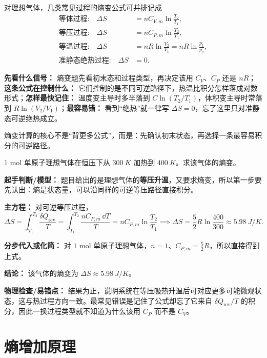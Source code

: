 \documentclass[lang=cn,11pt]{elegantbook}
\newcommand{\bridge}[1]{\begin{note}#1\end{note}}
\begin{document}
对理想气体，几类常见过程的熵变公式可并排记成
\begin{align*}
\text{等体过程:}\quad \Delta S&=nC_{V,m}\ln\frac{T_2}{T_1},\\
\text{等压过程:}\quad \Delta S&=nC_{P,m}\ln\frac{T_2}{T_1},\\
\text{等温过程:}\quad \Delta S&=nR\ln\frac{V_2}{V_1}=nR\ln\frac{p_1}{p_2},\\
\text{准静态绝热过程:}\quad \Delta S&=0.
\end{align*}

\begin{note}
\textbf{先看什么信号：} 熵变题先看初末态和过程类型，再决定该用 \(C_V\)、\(C_P\) 还是 \(nR\)；\textbf{这条公式在控制什么：} 它们控制的是不同可逆路径下，热温比积分怎样落成对数形式；\textbf{怎样最快记住：} 温度变主导时多半落到 \(C\ln(T_2/T_1)\)，体积变主导时常落到 \(R\ln(V_2/V_1)\)；\textbf{最容易错：} 看到“绝热”就一律写 \(\Delta S=0\)，忘了这里只对准静态可逆绝热成立。
\end{note}

\bridge{熵变计算的核心不是“背更多公式”，而是：先确认初末状态，再选择一条最容易积分的可逆路径。}

\begin{example}[等压升温的熵变]
1 mol 单原子理想气体在恒压下从 \(\SI{300}{K}\) 加热到 \(\SI{400}{K}\)。求该气体的熵变。
\end{example}

\begin{solution}
\textbf{起手判断/模型：} 题目给出的是理想气体的\textbf{等压升温}，又要求熵变，所以第一步要先认出：熵是状态量，可以沿同样的可逆等压路径直接积分。

\textbf{主方程：} 对可逆等压过程，
\[
\Delta S=\int_{T_1}^{T_2}\frac{\delta Q_{\mathrm{rev}}}{T}
=\int_{T_1}^{T_2}\frac{nC_{P,m}\,\dd T}{T}
=nC_{P,m}\ln\frac{T_2}{T_1}
\implies
\Delta S=\frac{5}{2}R\ln\frac{400}{300}\approx \SI{5.98}{J/K}.
\]

\textbf{分步代入或化简：} 对 \(1\) mol 单原子理想气体，\(n=1\)、\(C_{P,m}=\frac{5}{2}R\)，所以直接得到上式。

\textbf{结论：} 该气体的熵变为 \(\Delta S\approx \SI{5.98}{J/K}\)。

\textbf{物理检查/易错点：} 结果为正，说明系统在等压吸热升温后可对应更多可能微观状态，这与热过程方向一致。最常见错误是记住了公式却忘了它来自 \(\delta Q_{\mathrm{rev}}/T\) 的积分，因此一换过程类型就不知道为什么该用 \(C_P\) 而不是 \(C_V\)。
\end{solution}

\section{熵增加原理}
\end{document}
